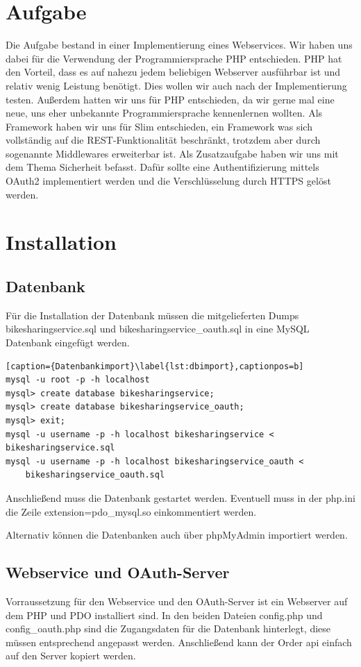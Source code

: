 \chapter{Aufgabe}

Die Aufgabe bestand in einer Implementierung eines Webservices. Wir haben uns dabei für die Verwendung der Programmiersprache PHP entschieden. PHP hat den Vorteil, dass es auf nahezu jedem beliebigen Webserver ausführbar ist und relativ wenig Leistung benötigt. Dies wollen wir auch nach der Implementierung testen. Außerdem hatten wir uns für PHP entschieden, da wir gerne mal eine neue, uns eher unbekannte Programmiersprache kennenlernen wollten.
Als Framework haben wir uns für Slim\cite{slim} entschieden, ein Framework was sich vollständig auf die REST-Funktionalität beschränkt, trotzdem aber durch sogenannte Middlewares erweiterbar ist.
Als Zusatzaufgabe haben wir uns mit dem Thema Sicherheit befasst. Dafür sollte eine Authentifizierung mittels OAuth2\cite{oauth} implementiert werden und die Verschlüsselung durch HTTPS gelöst werden.


\chapter{Installation}
\section{Datenbank}
Für die Installation der Datenbank müssen die mitgelieferten Dumps bikesharingservice.sql und bikesharingservice\_oauth.sql in eine MySQL Datenbank eingefügt werden.
\begin{lstlisting}[caption={Datenbankimport}\label{lst:dbimport},captionpos=b] 
mysql -u root -p -h localhost
mysql> create database bikesharingservice;
mysql> create database bikesharingservice_oauth;
mysql> exit;
mysql -u username -p -h localhost bikesharingservice < bikesharingservice.sql
mysql -u username -p -h localhost bikesharingservice_oauth < 
	bikesharingservice_oauth.sql
\end{lstlisting}
Anschließend muss die Datenbank gestartet werden.
Eventuell muss in der php.ini die Zeile extension=pdo\_mysql.so einkommentiert werden.

Alternativ können die Datenbanken auch über phpMyAdmin importiert werden.

\section{Webservice und OAuth-Server}
Vorraussetzung für den Webservice und den OAuth-Server ist ein Webserver auf dem PHP und PDO installiert sind. In den beiden Dateien config.php und config\_oauth.php sind die Zugangsdaten für die Datenbank hinterlegt, diese müssen entsprechend angepasst werden. Anschließend kann der Order api einfach auf den Server kopiert werden. 
